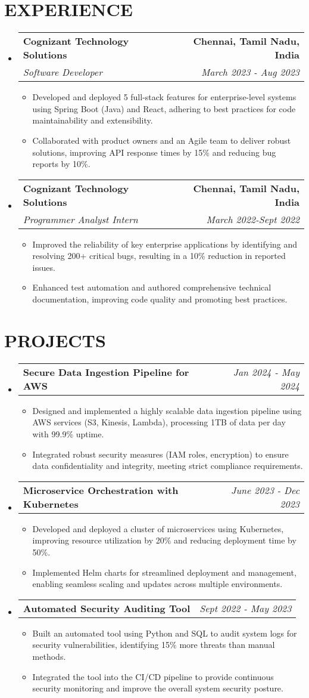 \documentclass[letterpaper,11pt]{article}
\makeatletter
\newcommand{\resumeItem}[1]{\item\small{{#1 \vspace{-2pt}}}}
\newcommand{\resumeSubheading}[4]{\vspace{-2pt}\item\begin{tabular*}{0.97\textwidth}[t]{l@{\extracolsep{\fill}}r}\textbf{#1} & #2 \\\textit{\small#3} & \textit{\small #4} \\\end{tabular*}\vspace{-7pt}}
\newcommand{\resumeProjectHeading}[2]{\item\begin{tabular*}{0.97\textwidth}{l@{\extracolsep{\fill}}r}\small#1 & #2 \\\end{tabular*}\vspace{-7pt}}
\newcommand{\resumeSubHeadingListStart}{\begin{itemize}[leftmargin=0.15in, label={}]}
\newcommand{\resumeSubHeadingListEnd}{\end{itemize}}
\newcommand{\resumeItemListStart}{\begin{itemize}}
\newcommand{\resumeItemListEnd}{\end{itemize}\vspace{-5pt}}
\makeatother
\begin{document}
\section{{\fontsize{9pt}{20pt}\selectfont \textbf{EXPERIENCE}}}
\resumeSubHeadingListStart
\resumeSubheading{Cognizant Technology Solutions}{\textbf{Chennai, Tamil Nadu, India}}{Software Developer}{March 2023 - Aug 2023}
\resumeItemListStart
\resumeItem{Developed and deployed 5 full-stack features for enterprise-level systems using Spring Boot (Java) and React, adhering to best practices for code maintainability and extensibility.}
\resumeItem{Collaborated with product owners and an Agile team to deliver robust solutions, improving API response times by 15\% and reducing bug reports by 10\%.}
\resumeItemListEnd
\resumeSubheading{Cognizant Technology Solutions}{\textbf{Chennai, Tamil Nadu, India}}{Programmer Analyst Intern}{March 2022-Sept 2022}
\resumeItemListStart
\resumeItem{Improved the reliability of key enterprise applications by identifying and resolving 200+ critical bugs, resulting in a 10\% reduction in reported issues.}
\resumeItem{Enhanced test automation and authored comprehensive technical documentation, improving code quality and promoting best practices.}
\resumeItemListEnd
\resumeSubHeadingListEnd
\vspace{-17pt}

\section{{\fontsize{9pt}{20pt}\selectfont \textbf{PROJECTS}}}
\resumeSubHeadingListStart
\resumeProjectHeading{\textbf{Secure Data Ingestion Pipeline for AWS}}{\textit{Jan 2024 - May 2024}}
\resumeItemListStart
\resumeItem{Designed and implemented a highly scalable data ingestion pipeline using AWS services (S3, Kinesis, Lambda), processing 1TB of data per day with 99.9\% uptime.}
\resumeItem{Integrated robust security measures (IAM roles, encryption) to ensure data confidentiality and integrity, meeting strict compliance requirements.}
\resumeItemListEnd\vspace{-6pt}
\resumeProjectHeading{\textbf{Microservice Orchestration with Kubernetes}}{\textit{June 2023 - Dec 2023}}
\resumeItemListStart
\resumeItem{Developed and deployed a cluster of microservices using Kubernetes, improving resource utilization by 20\% and reducing deployment time by 50\%.}
\resumeItem{Implemented Helm charts for streamlined deployment and management, enabling seamless scaling and updates across multiple environments.}
\resumeItemListEnd\vspace{-6pt}
\resumeProjectHeading{\textbf{Automated Security Auditing Tool}}{\textit{Sept 2022 - May 2023}}
\resumeItemListStart
\resumeItem{Built an automated tool using Python and SQL to audit system logs for security vulnerabilities, identifying 15\% more threats than manual methods.}
\resumeItem{Integrated the tool into the CI/CD pipeline to provide continuous security monitoring and improve the overall system security posture.}
\resumeItemListEnd
\resumeSubHeadingListEnd
\vspace{-17pt}
\end{document}
